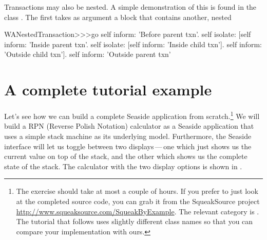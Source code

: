 \documentclass[a4paper,10pt,twoside]{book}
\begin{document}
Transactions may also be nested.
A simple demonstration of this is found in the class .
The first  takes as argument a block that contains another, nested 


\begin{code}{}
WANestedTransaction>>>go
	self inform: 'Before parent txn'.
	self isolate:
			[self inform: 'Inside parent txn'.
			self isolate: [self inform: 'Inside child txn'].
			self inform: 'Outside child txn'].
	self inform: 'Outside parent txn'
\end{code}


\section{A complete tutorial example}


Let's see how we can build a complete Seaside application from scratch.\footnote{The exercise should take at most a couple of hours. If you prefer to just look at the completed source code, you can grab it from the SqueakSource project \url{http://www.squeaksource.com/SqueakByExample}.
The relevant category is . The tutorial that follows uses slightly different class names so that you can compare your implementation with ours.}
We will build a RPN (Reverse Polish Notation) calculator as a Seaside application that uses a simple stack machine as its underlying model.
Furthermore, the Seaside interface will let us toggle between two displays\,---\,one which just shows us the current value on top of the stack, and the other which shows us the complete state of the stack.
The calculator with the two display options is shown in .
\end{document}
